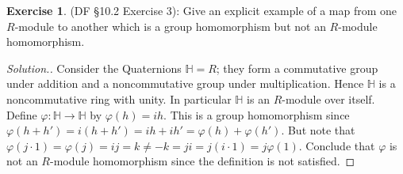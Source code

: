 \documentclass[8pt]{amsart}
\makeatletter
\theoremstyle{plain}%
\theoremstyle{definition}
\newtheorem{exercise}{Exercise}[section]
\theoremstyle{remark}
\numberwithin{equation}{section}
\newenvironment{solution}
               {\let\oldqedsymbol=\qedsymbol%
                \def\@addpunct##1{}%
                \renewcommand{\qedsymbol}{$\blacktriangleleft$}%
                \begin{proof}[\itshape Solution.]}%
               {\end{proof}%
                \renewcommand{\qedsymbol}{\oldqedsymbol}}
\makeatother
\begin{document}
\begin{exercise}
(DF \S 10.2 Exercise 3): Give an explicit example of a map from one $R$-module to another which is a group homomorphism but not an $R$-module homomorphism.
	\begin{solution}
		Consider the Quaternions $\mathbb H = R$; they form a commutative group under addition and a noncommutative group under multiplication. Hence $\mathbb H$ is a noncommutative ring with unity. In particular $\mathbb H$ is an $R$-module over itself. Define $\varphi : \mathbb H \to \mathbb H$ by $\varphi(h) = ih$. This is a group homomorphism since $\varphi(h + h') = i(h + h') = ih + ih' = \varphi(h) + \varphi(h')$. But note that $\varphi(j \cdot 1) = \varphi(j) = ij = k \neq -k = ji = j(i \cdot 1) = j \varphi(1)$. Conclude that $\varphi$ is not an $R$-module homomorphism since the definition is not satisfied.
	\end{solution}
\end{exercise}
\end{document}
